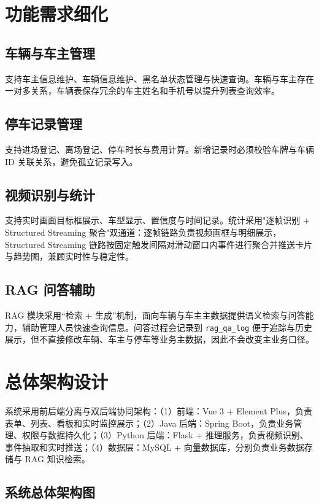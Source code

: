 \documentclass{wzuthesis} %
\begin{document}
\section{功能需求细化}

\subsection{车辆与车主管理}

支持车主信息维护、车辆信息维护、黑名单状态管理与快速查询。车辆与车主存在一对多关系，车辆表保存冗余的车主姓名和手机号以提升列表查询效率。

\subsection{停车记录管理}

支持进场登记、离场登记、停车时长与费用计算。新增记录时必须校验车牌与车辆 ID 关联关系，避免孤立记录写入。

\subsection{视频识别与统计}

支持实时画面目标框展示、车型显示、置信度与时间记录。统计采用"逐帧识别 + Structured Streaming 聚合"双通道：逐帧链路负责视频画框与明细展示，Structured Streaming 链路按固定触发间隔对滑动窗口内事件进行聚合并推送卡片与趋势图，兼顾实时性与稳定性。

\subsection{RAG 问答辅助}

RAG 模块采用“检索 + 生成”机制，面向车辆与车主主数据提供语义检索与问答能力，辅助管理人员快速查询信息。问答过程会记录到 \texttt{rag\_qa\_log} 便于追踪与历史展示，但不直接修改车辆、车主与停车等业务主数据，因此不会改变主业务口径。


\section{总体架构设计}

系统采用前后端分离与双后端协同架构：（1）前端：Vue 3 + Element Plus，负责表单、列表、看板和实时监控展示；（2）Java 后端：Spring Boot，负责业务管理、权限与数据持久化；（3）Python 后端：Flask + 推理服务，负责视频识别、事件抽取和实时推送；（4）数据层：MySQL + 向量数据库，分别负责业务数据存储与 RAG 知识检索。

\subsection{系统总体架构图}
\end{document}
